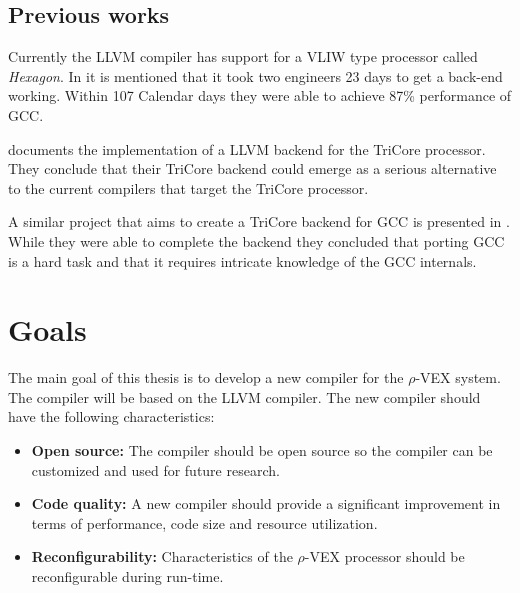 \subsection{Previous works}
Currently the LLVM compiler has support for a VLIW type processor called \emph{Hexagon}. In \cite{Simpson:2011qc} it is mentioned that it took two engineers 23 days to get a back-end working. Within 107 Calendar days they were able to achieve 87\% performance of GCC.

\cite{Erhardt:2009sy} documents the implementation of a LLVM backend for the TriCore processor. They conclude that their TriCore backend could emerge as a serious alternative to the current compilers that target the TriCore processor.

A similar project that aims to create a TriCore backend for GCC is presented in \cite{Antani:2014om}. While they were able to complete the backend they concluded that porting GCC is a hard task and that it requires intricate knowledge of the GCC internals.



\section{Goals}
The main goal of this thesis is to develop a new compiler for the $\rho$-VEX system. The compiler will be based on the LLVM compiler. The new compiler should have the following characteristics:

\begin{itemize}
	\item \textbf{Open source:} The compiler should be open source so the compiler can be customized and used for future research.
	\item \textbf{Code quality:} A new compiler should provide a significant improvement in terms of performance, code size and resource utilization.
	\item \textbf{Reconfigurability:} Characteristics of the $\rho$-VEX processor should be reconfigurable during run-time.
\end{itemize}

